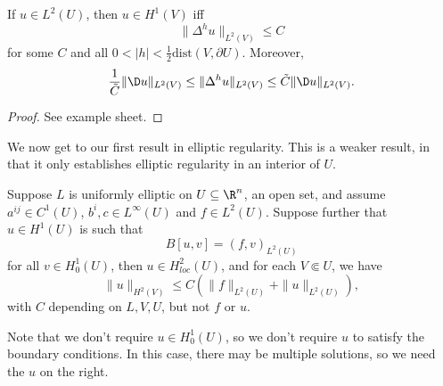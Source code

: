 \documentclass[a4paper]{article}
\begin{document}
\begin{lemma}
  If $u \in L^2(U)$, then $u \in H^1(V)$ iff
  \[
    \|\Delta^h u\|_{L^2(V)} \leq C
  \]
  for some $C$ and all $0 < |h| < \frac{1}{2} \mathrm{dist}(V, \partial U)$. Moreover,
  \[
    \frac{1}{\tilde{C}} \|\D u\|_{L^2(V)} \leq \|\Delta^h u\|_{L^2(V)} \leq \tilde{C} \|\D u\|_{L^2(V)}.
  \]
\end{lemma}

\begin{proof}
  See example sheet.
\end{proof}

We now get to our first result in elliptic regularity. This is a weaker result, in that it only establishes elliptic regularity in an interior of $U$.
\begin{thm}
  Suppose $L$ is uniformly elliptic on $U \subseteq \R^n$, an open set, and assume $a^{ij} \in C^1(U)$, $b^i, c \in L^\infty(U)$ and $f \in L^2(U)$. Suppose further that $u \in H^1(U)$ is such that
  \[
    B[u, v] = (f, v)_{L^2(U)}\tag{$\dagger$}
  \]
  for all $v \in H_0^1(U)$, then $u \in H_{loc}^2(U)$, and for each $V \Subset U$, we have
  \[
    \|u\|_{H^2(V)} \leq C (\|f\|_{L^2(U)} + \|u\|_{L^2(U)}),
  \]
  with $C$ depending on $L, V, U$, but not $f$ or $u$.
\end{thm}
Note that we don't require $u \in H^1_0(U)$, so we don't require $u$ to satisfy the boundary conditions. In this case, there may be multiple solutions, so we need the $u$ on the right.
\end{document}

